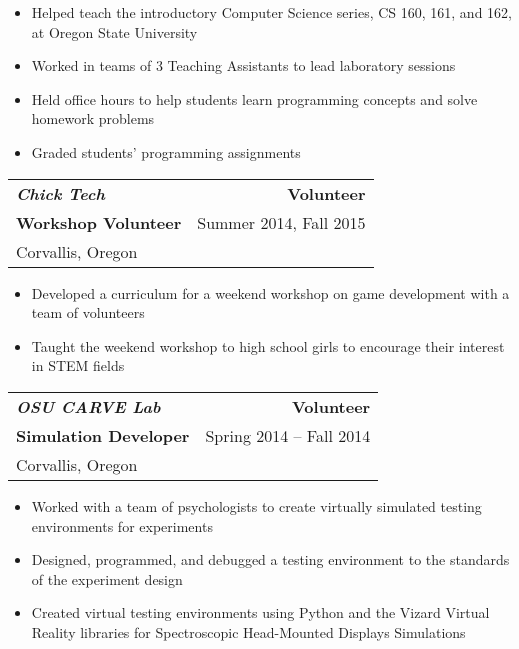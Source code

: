 \documentclass[letterpaper,10pt,titlepage]{article}
\begin{document}
\begin{itemize} \itemsep1pt \parskip0pt 
\item Helped teach the introductory Computer Science series, CS 160, 161, and 162, at Oregon State University
\item Worked in teams of 3 Teaching Assistants to lead laboratory sessions
\item Held office hours to help students learn programming concepts and solve homework problems
\item Graded students' programming assignments
\end{itemize}

\begin{tabularx}{\linewidth}{Xr}
\textbf{\textit{Chick Tech}}   & \textbf{Volunteer}\\
\textbf{Workshop Volunteer}    & Summer 2014, Fall 2015\\
Corvallis, Oregon & \\
\end{tabularx}

\begin{itemize} \itemsep1pt \parskip0pt 
\item Developed a curriculum for a weekend workshop on game development with a team of volunteers
\item Taught the weekend workshop to high school girls to encourage their interest in STEM fields
\end{itemize}

\begin{tabularx}{\linewidth}{Xr}
\textbf{\textit{OSU CARVE Lab}} & \textbf{Volunteer}\\
\textbf{Simulation Developer}   & Spring 2014 -- Fall 2014\\
Corvallis, Oregon & \\
\end{tabularx}


\begin{itemize} \itemsep1pt \parskip0pt 
\item Worked with a team of psychologists to create virtually simulated testing environments for experiments
\item Designed, programmed, and debugged a testing environment to the standards of the experiment design
\item Created virtual testing environments using Python and the Vizard Virtual Reality libraries for Spectroscopic Head-Mounted Displays Simulations
\end{itemize}
\end{document}
